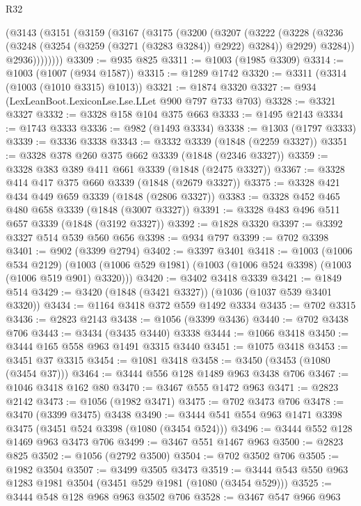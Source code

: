 \begin{lexlean}{R32}
\begin{coremodule}
      (@3143
        (@3151
          (@3159
            (@3167
              (@3175
                (@3200
                  (@3207
                    (@3222
                      (@3228
                        (@3236 (@3248 (@3254 (@3259 (@3271 (@3283 @3284)) @2922) @3284)) @2929)
                        @3284))
                    @2936))))))))
@3309 := @935 @825
@3311 := @1003 (@1985 @3309)
@3314 := @1003 (@1007 (@934 @1587))
@3315 := @1289 @1742
@3320 := @3311 (@3314 (@1003 (@1010 @3315) @1013))
@3321 := @1874 @3320
@3327 := @934 (LexLeanBoot.LexiconLse.Lse.LLet @900 @797 @733 @703)
@3328 := @3321 @3327
@3332 := @3328 @158 @104 @375 @663
@3333 := @1495 @2143
@3334 := @1743 @3333
@3336 := @982 (@1493 @3334)
@3338 := @1303 (@1797 @3333)
@3339 := @3336 @3338
@3343 := @3332 @3339 (@1848 (@2259 @3327))
@3351 := @3328 @378 @260 @375 @662 @3339 (@1848 (@2346 @3327))
@3359 := @3328 @383 @389 @411 @661 @3339 (@1848 (@2475 @3327))
@3367 := @3328 @414 @417 @375 @660 @3339 (@1848 (@2679 @3327))
@3375 := @3328 @421 @434 @449 @659 @3339 (@1848 (@2806 @3327))
@3383 := @3328 @452 @465 @480 @658 @3339 (@1848 (@3007 @3327))
@3391 := @3328 @483 @496 @511 @657 @3339 (@1848 (@3192 @3327))
@3392 := @1828 @3320
@3397 := @3392 @3327 @514 @539 @560 @656
@3398 := @934 @797
@3399 := @702 @3398
@3401 := @902 (@3399 @2794)
@3402 := @3397 @3401
@3418 := @1003
    (@1006 @534 @2129)
    (@1003 (@1006 @529 @1981) (@1003 (@1006 @524 @3398) (@1003 (@1006 @519 @901) @3320)))
@3420 := @3402 @3418 @3339
@3421 := @1849 @514
@3429 := @3420 (@1848 (@3421 @3327)) (@1036 (@1037 @539 @3401 @3320))
@3434 := @1164 @3418 @372 @559 @1492 @3334
@3435 := @702 @3315
@3436 := @2823 @2143
@3438 := @1056 (@3399 @3436)
@3440 := @702 @3438 @706
@3443 := @3434 (@3435 @3440) @3338
@3444 := @1066 @3418
@3450 := @3444 @165 @558 @963 @1491 @3315 @3440
@3451 := @1075 @3418
@3453 := @3451 @37 @3315
@3454 := @1081 @3418
@3458 := @3450 (@3453 (@1080 (@3454 @37)))
@3464 := @3444 @556 @128 @1489 @963 @3438 @706
@3467 := @1046 @3418 @162 @80
@3470 := @3467 @555 @1472 @963
@3471 := @2823 @2142
@3473 := @1056 (@1982 @3471)
@3475 := @702 @3473 @706
@3478 := @3470 (@3399 @3475) @3438
@3490 := @3444 @541 @554 @963 @1471 @3398 @3475 (@3451 @524 @3398 (@1080 (@3454 @524)))
@3496 := @3444 @552 @128 @1469 @963 @3473 @706
@3499 := @3467 @551 @1467 @963
@3500 := @2823 @825
@3502 := @1056 (@2792 @3500)
@3504 := @702 @3502 @706
@3505 := @1982 @3504
@3507 := @3499 @3505 @3473
@3519 := @3444 @543 @550 @963 @1283 @1981 @3504 (@3451 @529 @1981 (@1080 (@3454 @529)))
@3525 := @3444 @548 @128 @968 @963 @3502 @706
@3528 := @3467 @547 @966 @963

\end{coremodule}
\end{lexlean}
